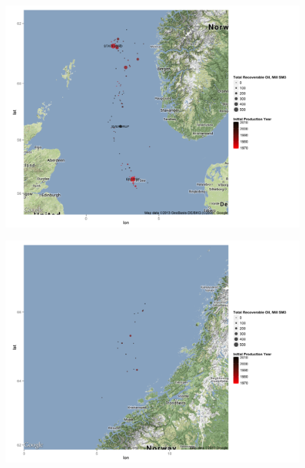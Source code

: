 \documentclass{beamer}
\begin{document}

\begin{frame}[plain]
	\begin{figure}
	\includegraphics[width=1\textwidth]{north_sea_reserves.png}
	\end{figure}
\end{frame}


\begin{frame}[plain]
	\begin{figure}
	\includegraphics[width=1\textwidth]{norwegian_sea_reserves.png}
	\end{figure}
\end{frame}
\end{document}

